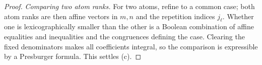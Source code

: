 \documentclass[10pt,a4paper]{amsart}
\begin{document}
\begin{proof}
\vspace{0.5em}
\noindent\emph{Comparing two atom ranks.}  For two atoms, refine to a common case; both
atom ranks are then affine vectors in $m,n$ and the repetition indices $j_\ell$.
Whether one is lexicographically smaller than the other is a Boolean
combination of affine equalities and inequalities and the congruences defining
the case.  Clearing the fixed denominators makes all coefficients integral, so
the comparison is expressible by a Presburger formula.  This
settles (c).
\end{proof}
\end{document}
